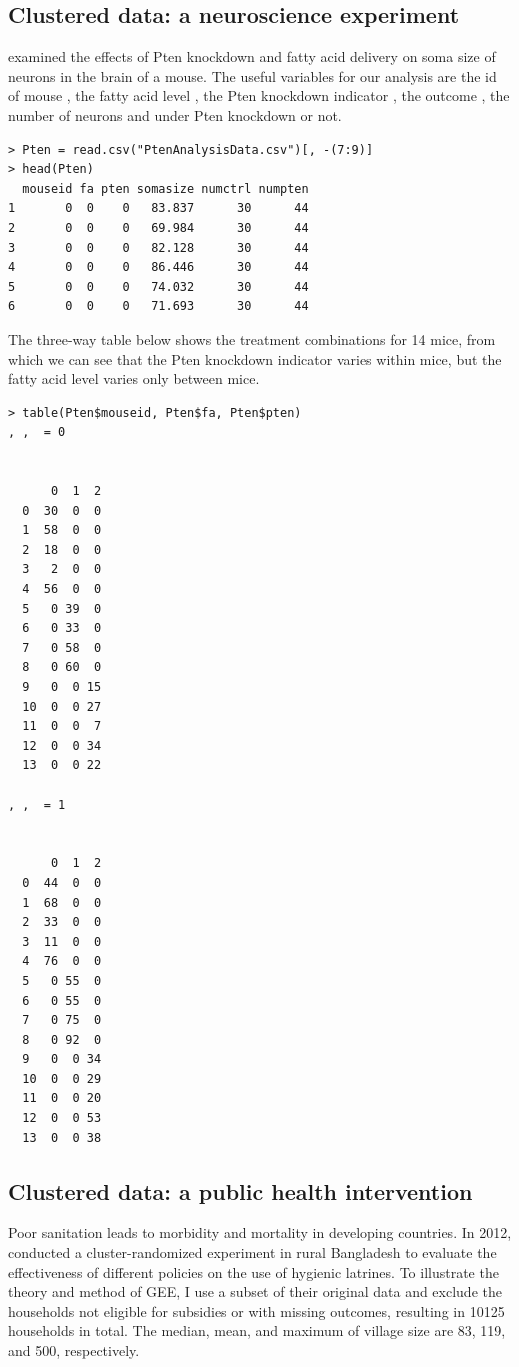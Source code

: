 \subsection{Clustered data: a neuroscience experiment} 
\label{section::cluster-neuro}

\citet{moen2016analyzing} examined the effects of Pten knockdown and fatty acid delivery on soma size of neurons in the brain of a mouse. The useful variables for our analysis are the id of mouse , the fatty acid level , the Pten knockdown indicator , the outcome , the number of neurons  and  under Pten knockdown or not.


\begin{lstlisting}
> Pten = read.csv("PtenAnalysisData.csv")[, -(7:9)]
> head(Pten)
  mouseid fa pten somasize numctrl numpten
1       0  0    0   83.837      30      44
2       0  0    0   69.984      30      44
3       0  0    0   82.128      30      44
4       0  0    0   86.446      30      44
5       0  0    0   74.032      30      44
6       0  0    0   71.693      30      44
\end{lstlisting}

The three-way table below shows the treatment combinations for 14 mice, from which
we can see that the Pten knockdown indicator varies within mice, but the fatty acid level varies only between mice. 
\begin{lstlisting}
> table(Pten$mouseid, Pten$fa, Pten$pten)
, ,  = 0

    
      0  1  2
  0  30  0  0
  1  58  0  0
  2  18  0  0
  3   2  0  0
  4  56  0  0
  5   0 39  0
  6   0 33  0
  7   0 58  0
  8   0 60  0
  9   0  0 15
  10  0  0 27
  11  0  0  7
  12  0  0 34
  13  0  0 22

, ,  = 1

    
      0  1  2
  0  44  0  0
  1  68  0  0
  2  33  0  0
  3  11  0  0
  4  76  0  0
  5   0 55  0
  6   0 55  0
  7   0 75  0
  8   0 92  0
  9   0  0 34
  10  0  0 29
  11  0  0 20
  12  0  0 53
  13  0  0 38
  \end{lstlisting}


\subsection{Clustered data: a public health intervention} 
\label{section::cluster-publichealth}


Poor sanitation leads to morbidity and mortality in developing countries. In 2012, \citet{guiteras2015encouraging} conducted a cluster-randomized experiment in rural Bangladesh to evaluate the effectiveness of different policies on the use of hygienic latrines. To illustrate the theory and method of GEE, I use a subset of their original data and exclude the households not eligible for subsidies or with missing outcomes, resulting in 10125 households in total. The median, mean, and maximum of village size are 83, 119, and 500, respectively.

